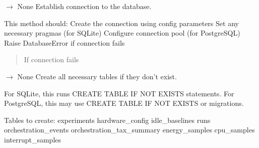 \documentclass[letterpaper,10pt,english]{sphinxmanual}
\begin{document}
\begin{fulllineitems}
\begin{fulllineitems}
\end{fulllineitems}


\begin{fulllineitems}
\label{\detokenize{core.database.base:core.database.base.DatabaseInterface.connect}}
\pysigstartsignatures
\pysiglinewithargsret
{}
{}
{{ $\rightarrow$ None}}
\pysigstopsignatures
\sphinxAtStartPar
Establish connection to the database.

\sphinxAtStartPar
This method should:
\sphinxhyphen{} Create the connection using config parameters
\sphinxhyphen{} Set any necessary pragmas (for SQLite)
\sphinxhyphen{} Configure connection pool (for PostgreSQL)
\sphinxhyphen{} Raise DatabaseError if connection fails
\begin{quote}\begin{description}
\sphinxAtStartPar
{\hyperref[\detokenize{core.database.base:core.database.base.DatabaseError}]{}} \textendash{} If connection fails

\end{description}\end{quote}

\end{fulllineitems}


\begin{fulllineitems}
\label{\detokenize{core.database.base:core.database.base.DatabaseInterface.create_tables}}
\pysigstartsignatures
\pysiglinewithargsret
{}
{}
{{ $\rightarrow$ None}}
\pysigstopsignatures
\sphinxAtStartPar
Create all necessary tables if they don’t exist.

\sphinxAtStartPar
For SQLite, this runs CREATE TABLE IF NOT EXISTS statements.
For PostgreSQL, this may use CREATE TABLE IF NOT EXISTS or migrations.

\sphinxAtStartPar
Tables to create:
\sphinxhyphen{} experiments
\sphinxhyphen{} hardware\_config
\sphinxhyphen{} idle\_baselines
\sphinxhyphen{} runs
\sphinxhyphen{} orchestration\_events
\sphinxhyphen{} orchestration\_tax\_summary
\sphinxhyphen{} energy\_samples
\sphinxhyphen{} cpu\_samples
\sphinxhyphen{} interrupt\_samples


\end{fulllineitems}
\end{fulllineitems}
\end{document}
